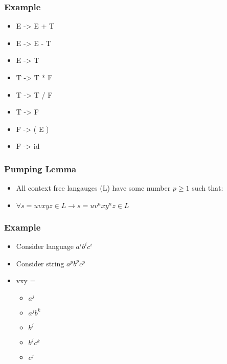 \documentclass[usepdftitle=false,professionalfonts,compress ]{beamer}
\begin{document}
{
\begin{frame}\frametitle{Example}

	\begin{itemize}
	\item E -> E + T
			\item E -> E - T
			\item E -> T
			\item T -> T * F
			\item T -> T / F
			\item T -> F
			\item F -> ( E )
			\item F -> id
				\end{itemize}

\end{frame}}










{
\begin{frame}\frametitle{Pumping Lemma}

	\begin{itemize}
	\item All context free langauges (L) have some number $p \geq 1$ such that:
			\item $\forall s = uvxyz \in L \rightarrow s = uv^nxy^nz \in L$
				\end{itemize}

\end{frame}}




{
\begin{frame}\frametitle{Example}

	\begin{itemize}
	\item Consider language $a^ib^ic^i$
			\item Consider string $a^pb^pc^p$
			\item vxy =

	\begin{itemize}
	\item $a^j$
			\item $a^jb^k$
			\item $b^j$
			\item $b^jc^k$
			\item $c^j$
				\end{itemize}

				\end{itemize}

\end{frame}}
\end{document}
